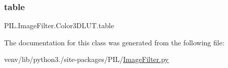 \subsubsection{\texorpdfstring{table}{table}}
{\footnotesize\ttfamily P\+I\+L.\+Image\+Filter.\+Color3\+D\+L\+U\+T.\+table}



The documentation for this class was generated from the following file\+:\begin{DoxyCompactItemize}
\item 
venv/lib/python3./site-\/packages/\+P\+I\+L/\hyperlink{ImageFilter_8py}{Image\+Filter.\+py}\end{DoxyCompactItemize}

